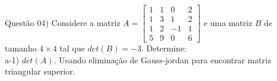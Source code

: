 
\makeatletter
\renewcommand*\env@matrix[1][*\c@MaxMatrixCols c]{%
    \hskip -\arraycolsep
    \let\@ifnextchar\new@ifnextchar
    \array{#1}}
\makeatother

\noindent \textcolor{COLOR1}{Questão 04)} Considere a matriz $A = \begin{bmatrix}
        1 & 1 & 0  & 2 \\
        1 & 3 & 1  & 2 \\
        1 & 2 & -1 & 1 \\
        5 & 9 & 0  & 6
    \end{bmatrix}$ e uma matriz $B$ de tamanho $4\times 4$ tal que $det(B)=-3$. Determine:
\\

a-1) $det(A)$. Usando eliminação de Gauss-jordan para encontrar matriz triangular superior.
\\

